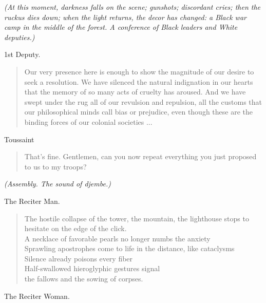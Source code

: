 \documentclass[letterpaper,article,12pt,oneside,notitlepage]{memoir}
\begin{document}
\textit{(At this moment, darkness falls on the scene; gunshots; discordant cries; then the ruckus dies down; when the light returns, the decor has changed: a Black war camp in the middle of the forest. A conference of Black leaders and White deputies.)}

\begin{center}1st Deputy.\end{center}

\begin{verse}
\indent Our very presence here is enough to show the magnitude of our desire to seek a resolution. We have silenced the natural indignation in our hearts that the memory of so many acts of cruelty has aroused. And we have swept under the rug all of our revulsion and repulsion, all the customs that our philosophical minds call bias or prejudice, even though these are the binding forces of our colonial societies ... \\
\end{verse}

\begin{center}Toussaint\end{center}

\begin{verse}
\indent That's fine. Gentlemen, can you now repeat everything you just proposed to us to my troops? \\
\end{verse}

\textit{(Assembly. The sound of djembe.)}

\clearpage

\begin{center}The Reciter Man.\end{center}

\begin{verse}
The hostile collapse of the tower, the mountain, the lighthouse stops to hesitate on the edge of the click. \\
A necklace of favorable pearls no longer numbs the anxiety \\
Sprawling apostrophes come to life in the distance, like cataclysms \\
Silence already poisons every fiber \\
Half-swallowed hieroglyphic gestures signal \\
the fallows and the sowing of corpses. \\
\end{verse}

\begin{center}The Reciter Woman.\end{center}
\end{document}
